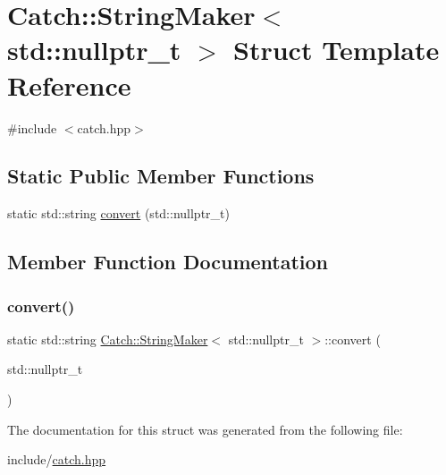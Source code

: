 \hypertarget{structCatch_1_1StringMaker_3_01std_1_1nullptr__t_01_4}{}\section{Catch\+:\+:String\+Maker$<$ std\+:\+:nullptr\+\_\+t $>$ Struct Template Reference}
\label{structCatch_1_1StringMaker_3_01std_1_1nullptr__t_01_4}


{\ttfamily \#include $<$catch.\+hpp$>$}

\subsection*{Static Public Member Functions}
\begin{DoxyCompactItemize}
\item 
static std\+::string \mbox{\hyperlink{structCatch_1_1StringMaker_3_01std_1_1nullptr__t_01_4_a131fbb1f5cd68c93aaf30d34e3519e9c}{convert}} (std\+::nullptr\+\_\+t)
\end{DoxyCompactItemize}


\subsection{Member Function Documentation}
\mbox{\label{structCatch_1_1StringMaker_3_01std_1_1nullptr__t_01_4_a131fbb1f5cd68c93aaf30d34e3519e9c}} 
\subsubsection{\texorpdfstring{convert()}{convert()}}
{\footnotesize\ttfamily static std\+::string \mbox{\hyperlink{structCatch_1_1StringMaker}{Catch\+::\+String\+Maker}}$<$ std\+::nullptr\+\_\+t $>$\+::convert (\begin{DoxyParamCaption}\item[{std\+::nullptr\+\_\+t}]{ }\end{DoxyParamCaption})\hspace{0.3cm}{\ttfamily [static]}}



The documentation for this struct was generated from the following file\+:\begin{DoxyCompactItemize}
\item 
include/\mbox{\hyperlink{catch_8hpp}{catch.\+hpp}}\end{DoxyCompactItemize}
